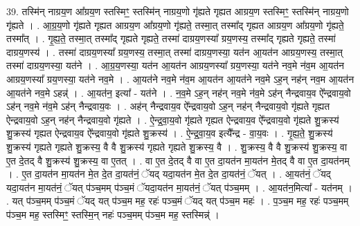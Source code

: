 \documentclass[17pt]{extarticle}
\begin{document}
39. तस्मि॑न् नाग्रय॒ण आ᳚ग्रय॒ण स्तस्मिꣳ॒॒ स्तस्मि॑न् नाग्रय॒णो गृ॑ह्यते गृह्यत आग्रय॒ण स्तस्मिꣳ॒॒ स्तस्मि॑न् नाग्रय॒णो गृ॑ह्यते । . आ॒ग्र॒य॒णो गृ॑ह्यते गृह्यत आग्रय॒ण आ᳚ग्रय॒णो गृ॑ह्यते॒ तस्मा॒त् तस्मा᳚द् गृह्यत आग्रय॒ण आ᳚ग्रय॒णो गृ॑ह्यते॒ तस्मा᳚त् । . गृ॒ह्य॒ते॒ तस्मा॒त् तस्मा᳚द् गृह्यते गृह्यते॒ तस्मा॑ दाग्रय॒णस्या᳚ ग्रय॒णस्य॒ तस्मा᳚द् गृह्यते गृह्यते॒ तस्मा॑ दाग्रय॒णस्य॑ । . तस्मा॑ दाग्रय॒णस्या᳚ ग्रय॒णस्य॒ तस्मा॒त् तस्मा॑ दाग्रय॒णस्या॒ यत॑न आ॒यत॑न आग्रय॒णस्य॒ तस्मा॒त् तस्मा॑ दाग्रय॒णस्या॒ यत॑ने । . आ॒ग्र॒य॒णस्या॒ यत॑न आ॒यत॑न आग्रय॒णस्या᳚ ग्रय॒णस्या॒ यत॑ने नव॒मे न॑व॒म आ॒यत॑न आग्रय॒णस्या᳚ ग्रय॒णस्या॒ यत॑ने नव॒मे । . आ॒यत॑ने नव॒मे न॑व॒म आ॒यत॑न आ॒यत॑ने नव॒मे ऽह॒न् नह॑न् नव॒म आ॒यत॑न आ॒यत॑ने नव॒मे ऽहन्न्॑ । . आ॒यत॑न॒ इत्या᳚ - यत॑ने । . न॒व॒मे ऽह॒न् नह॑न् नव॒मे न॑व॒मे ऽह॑न् नैन्द्रवाय॒व ऐ᳚न्द्रवाय॒वो ऽह॑न् नव॒मे न॑व॒मे ऽह॑न् नैन्द्रवाय॒वः । . अह॑न् नैन्द्रवाय॒व ऐ᳚न्द्रवाय॒वो ऽह॒न् नह॑न् नैन्द्रवाय॒वो गृ॑ह्यते गृह्यत ऐन्द्रवाय॒वो ऽह॒न् नह॑न् नैन्द्रवाय॒वो गृ॑ह्यते । . ऐ॒न्द्र॒वा॒य॒वो गृ॑ह्यते गृह्यत ऐन्द्रवाय॒व ऐ᳚न्द्रवाय॒वो गृ॑ह्यते शु॒क्रस्य॑ शु॒क्रस्य॑ गृह्यत ऐन्द्रवाय॒व ऐ᳚न्द्रवाय॒वो गृ॑ह्यते शु॒क्रस्य॑ । . ऐ॒न्द्र॒वा॒य॒व इत्यै᳚न्द्र - वा॒य॒वः । . गृ॒ह्य॒ते॒ शु॒क्रस्य॑ शु॒क्रस्य॑ गृह्यते गृह्यते शु॒क्रस्य॒ वै वै शु॒क्रस्य॑ गृह्यते गृह्यते शु॒क्रस्य॒ वै । . शु॒क्रस्य॒ वै वै शु॒क्रस्य॑ शु॒क्रस्य॒ वा ए॒त दे॒तद् वै शु॒क्रस्य॑ शु॒क्रस्य॒ वा ए॒तत् । . वा ए॒त दे॒तद् वै वा ए॒त दा॒यत॑न मा॒यत॑न मे॒तद् वै वा ए॒त दा॒यत॑नम् । . ए॒त दा॒यत॑न मा॒यत॑न मे॒त दे॒त दा॒यत॑नं॒ ॅयद् यदा॒यत॑न मे॒त दे॒त दा॒यत॑नं॒ ॅयत् । . आ॒यत॑नं॒ ॅयद् यदा॒यत॑न मा॒यत॑नं॒ ॅयत् प॑ञ्च॒मम् प॑ञ्च॒मं ॅयदा॒यत॑न मा॒यत॑नं॒ ॅयत् प॑ञ्च॒मम् । . आ॒यत॑न॒मित्या᳚ - यत॑नम् । . यत् प॑ञ्च॒मम् प॑ञ्च॒मं ॅयद् यत् प॑ञ्च॒म मह॒ रहः॑ पञ्च॒मं ॅयद् यत् प॑ञ्च॒म महः॑ । . प॒ञ्च॒म मह॒ रहः॑ पञ्च॒मम् प॑ञ्च॒म मह॒ स्तस्मिꣳ॒॒ स्तस्मि॒न् नहः॑ पञ्च॒मम् प॑ञ्च॒म मह॒ स्तस्मिन्न्॑ । \newline
\pagebreak
{}
\end{document}

